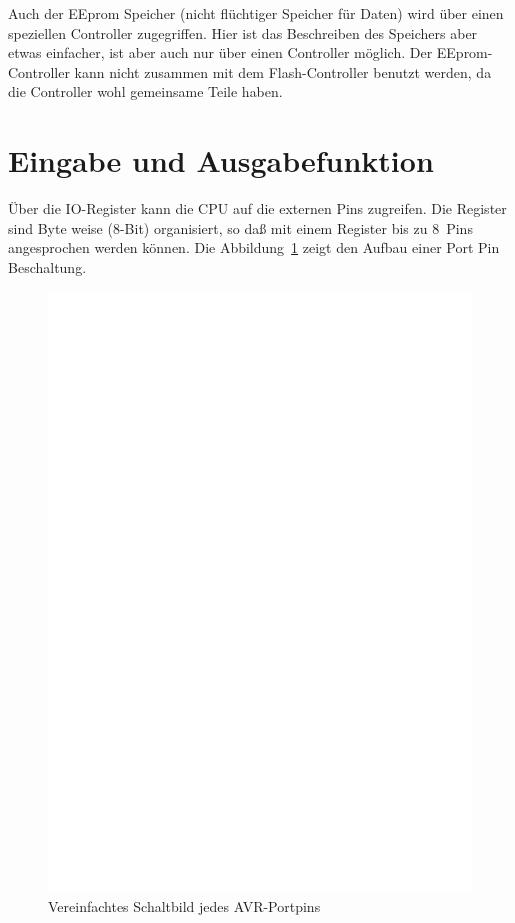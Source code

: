 Auch der EEprom Speicher (nicht flüchtiger Speicher für Daten) wird über
einen speziellen Controller zugegriffen. Hier ist das Beschreiben des Speichers
aber etwas einfacher, ist aber auch nur über einen Controller möglich.
Der EEprom-Controller kann nicht zusammen mit dem Flash-Controller benutzt werden,
da die Controller wohl gemeinsame Teile haben.

\section{Eingabe und Ausgabefunktion}

Über die IO-Register kann die CPU auf die externen Pins zugreifen. Die Register
sind Byte weise (8-Bit) organisiert, so daß mit einem Register bis zu 8~Pins
angesprochen werden können. Die Abbildung~\ref{fig:port} zeigt den 
Aufbau einer Port Pin Beschaltung.

\begin{figure}[H]
\centering
\includegraphics[]{../FIG/port.eps}
\caption{Vereinfachtes Schaltbild jedes AVR-Portpins}
\label{fig:port}
\end{figure}


